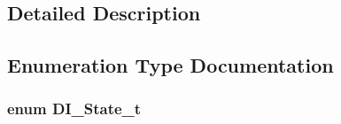 \subsection{Detailed Description}


\subsection{Enumeration Type Documentation}
\hypertarget{group__di__statemachine_ga1ff79a885858a15562d8bd473c1efe24}{
\subsubsection[{D\-I\-\_\-\-State\-\_\-t}]{\setlength{\rightskip}{0pt plus 5cm}enum {\bf D\-I\-\_\-\-State\-\_\-t}}}\label{group__di__statemachine_ga1ff79a885858a15562d8bd473c1efe24}
